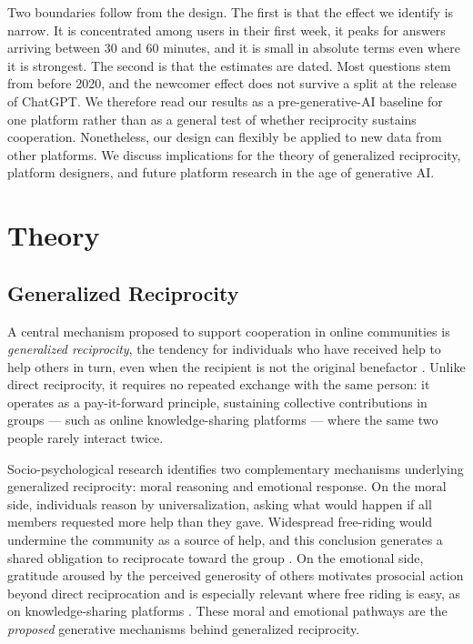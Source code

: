 Two boundaries follow from the design. The first is that the effect we identify is narrow. It is concentrated among users in their first week, it peaks for answers arriving between 30 and 60 minutes, and it is small in absolute terms even where it is strongest. The second is that the estimates are dated. Most questions stem from before 2020, and the newcomer effect does not survive a split at the release of ChatGPT. We therefore read our results as a pre-generative-AI baseline for one platform rather than as a general test of whether reciprocity sustains cooperation. Nonetheless, our design can flexibly be applied to new data from other platforms. We discuss implications for the theory of generalized reciprocity, platform designers, and future platform research in the age of generative AI. 

\section{Theory}

\subsection{Generalized Reciprocity}

A central mechanism proposed to support cooperation in online communities is \textit{generalized reciprocity}, the tendency for individuals who have received help to help others in turn, even when the recipient is not the original benefactor \citep{nowak_upstream_2007, fowler_cooperative_2010}. Unlike direct reciprocity, it requires no repeated exchange with the same person: it operates as a pay-it-forward principle, sustaining collective contributions in groups --- such as online knowledge-sharing platforms --- where the same two people rarely interact twice.

Socio-psychological research identifies two complementary mechanisms underlying generalized reciprocity: moral reasoning and emotional response. On the moral side, individuals reason by universalization, asking what would happen if all members requested more help than they gave. Widespread free-riding would undermine the community as a source of help, and this conclusion generates a shared obligation to reciprocate toward the group \citep{levine_logic_2020, curry_is_2019}. On the emotional side, gratitude aroused by the perceived generosity of others motivates prosocial action beyond direct reciprocation \citep{mccullough_is_2001, tsang_gratitude_2006, bartlett_gratitude_2006} and is especially relevant where free riding is easy, as on knowledge-sharing platforms \citep{molm_building_2007, elster_norms_2009}. These moral and emotional pathways are the \textit{proposed} generative mechanisms behind generalized reciprocity.

